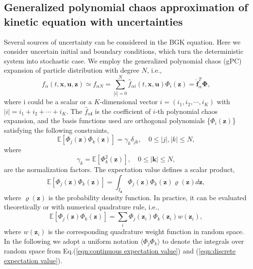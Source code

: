 \documentclass[preprint,3p,12pt,sort&compress]{elsarticle}
\begin{document}
\subsection{Generalized polynomial chaos approximation of kinetic equation with uncertainties}
Several sources of uncertainty can be considered in the BGK equation. Here we consider uncertain initial and boundary conditions, which turn the deterministic system into stochastic case.
We employ the generalized polynomial chaos (gPC) expansion of particle distribution with degree $N$, i.e.,
\begin{equation}
f_\alpha(t,\mathbf x,\mathbf u,\mathbf z) \simeq f_{\alpha N} = \sum_{|i|=0}^N \hat f_{\alpha i} (t,\mathbf x,\mathbf u) \Phi_i (\mathbf z) = \hat{\boldsymbol f}_\alpha^T \boldsymbol \Phi,
\label{eqn:polynomial chaos}
\end{equation}
where i could be a scalar or a $K$-dimensional vector $i=(i_1,i_2,\cdots,i_K)$ with $|i|=i_1+i_2+\cdots+i_K$.
The $\hat f_{\alpha \mathbf i}$ is the coefficient of $i$-th polynomial chaos expansion,
and the basis functions used are orthogonal polynomials \{$\Phi_ i(\mathbf z)$\} satisfying the following constraints,
\begin{equation}
\mathbb{E}[\Phi_ j (\mathbf z) \Phi_ k (\mathbf z)] = \gamma_ k \delta_{ j  k}, \quad 0 \leq | j|, | k| \leq N,
\end{equation}
where 
\begin{equation}
\gamma_ k=\mathbb{E}[\Phi_ k^2 (\mathbf z)], \quad 0 \leq |\mathbf k| \leq N,
\end{equation}
are the normalization factors.
The expectation value defines a scalar product,
\begin{equation}
\mathbb{E}[\Phi_ j (\mathbf z) \Phi_ k (\mathbf z)] = \int_{I_{\mathbf z}} \Phi_{ j}(\mathbf z) \Phi_{ k}(\mathbf z) \varrho(\mathbf z) d \mathbf z,
\label{eqn:continuous expectation value}
\end{equation}
where $\varrho(\mathbf z)$ is the probability density function.
In practice, it can be evaluated theoretically or with numerical quadrature rule, i.e.,
\begin{equation}
\mathbb{E}[\Phi_ j (\mathbf z) \Phi_ k (\mathbf z)] = \sum_i \Phi_{ j}(\mathbf z_i) \Phi_{ k}(\mathbf z_i) w(\mathbf z_i) ,
\label{eqn:discrete expectation value}
\end{equation}
where $w(\mathbf z_i)$ is the corresponding quadrature weight function in random space.
In the following we adopt a uniform notation $\langle \Phi_ j \Phi_ k \rangle$ to denote the integrals over random space from Eq.(\ref{eqn:continuous expectation value}) and (\ref{eqn:discrete expectation value}).
\end{document}
